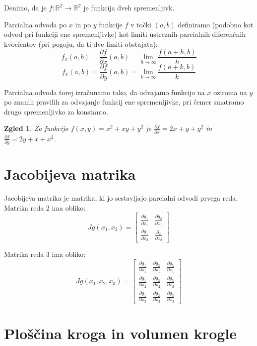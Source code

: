 \documentclass[12pt, a4paper]{article}
\newtheorem{zgled}{Zgled}
\begin{document}

Denimo, da je $f : \mathbb{R^2} \rightarrow \mathbb{R^2} $ je funkcija dveh spremenljivk.

Parcialna odvoda po $x$ in po $y$ funkcije $f$ v točki $(a, b)$ definiramo (podobno kot odvod pri funkciji ene spremenljivke) kot limiti ustreznih parcialnih diferenčnih kvocientov (pri pogoju, da ti dve limiti obstajata):
$$
f_x(a, b)= \frac{\partial f}{\partial x}(a, b) = \lim_{h\to\infty} \frac{f(a+h, b)}{h}
$$
$$
f_x(a, b)= \frac{\partial f}{\partial y}(a, b) = \lim_{k\to\infty} \frac{f(a+k, b)}{k}
$$

Parcialna odvoda torej izračunamo tako, da odvajamo funkcijo na $x$ oziroma na $y$ po znanih pravilih za odvajanje funkcij ene spremenljivke, pri čemer smatramo drugo spremenljivko za konstanto.

\begin{zgled}

Za funkcijo $f(x, y)= x^2+xy+y^2$ je $\frac{\partial f}{\partial x}= 2x+y+y^2$ in $\frac{\partial f}{\partial y}= 2y+x+x^2$.

\end{zgled}

\section{Jacobijeva matrika}
Jacobijeva matrika je matrika, ki jo sestavljajo parcialni odvodi prvega reda.
Matrika reda 2 ima obliko:
$$
Jg(x_1,x_2)=
\begin{bmatrix}
\frac{\partial g_1}{\partial x_1} & \frac{\partial g_2}{\partial x_1}  \\
\frac{\partial g_1}{\partial x_2} & \frac{\partial _2}{\partial x_2} 
\end{bmatrix}
$$

\noindent Matrika reda 3 ima obliko:
$$
Jg(x_1,x_2,x_3)=
\begin{bmatrix}
\frac{\partial g_1}{\partial x_1}  & \frac{\partial g_2}{\partial x_1}  & \frac{\partial g_3}{\partial x_1}  \\
\frac{\partial g_1}{\partial x_2}  & \frac{\partial g_2}{\partial x_2}  & \frac{\partial g_3}{\partial x_2}  \\
\frac{\partial g_1}{\partial x_3}  & \frac{\partial g_2}{\partial x_3}  & \frac{\partial g_3}{\partial x_3} 
\end{bmatrix}
$$



\section{Ploščina kroga in volumen krogle}
\end{document}
